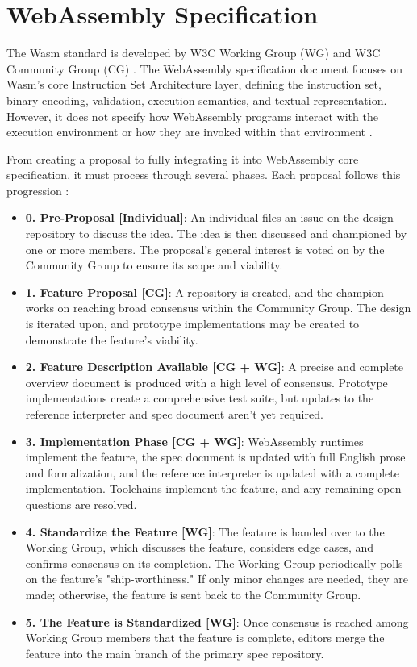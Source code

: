 \section{WebAssembly Specification}
\label{sec:wasm-specification}

The Wasm standard is developed by W3C Working Group (WG) and W3C Community Group (CG) \cite{webassemblycommunitygroup_2023_webassembly}. The WebAssembly specification document \cite{webassemblycommunitygroup_2023_webassembly} focuses on Wasm's core Instruction Set Architecture layer, defining the instruction set, binary encoding, validation, execution semantics, and textual representation. However, it does not specify how WebAssembly programs interact with the execution environment or how they are invoked within that environment \cite{webassemblycommunitygroup_2023_webassembly}.

From creating a proposal to fully integrating it into WebAssembly core specification, it must process through several phases. Each proposal follows this progression \cite{webassemblyw3c_2023_webassembly}:
\begin{itemize}
  \item \textbf{0. Pre-Proposal [Individual]}: An individual files an issue on the design repository to discuss the idea. The idea is then discussed and championed by one or more members. 
  The proposal's general interest is voted on by the Community Group to ensure its scope and viability.
  \item \textbf{1. Feature Proposal [CG]}: A repository is created, and the champion works on reaching broad consensus within the Community Group. The design is iterated upon, and prototype implementations may be created to demonstrate the feature's viability.
  \item \textbf{2. Feature Description Available [CG + WG]}: A precise and complete overview document is produced with a high level of consensus. Prototype implementations create a comprehensive 
  test suite, but updates to the reference interpreter and spec document aren't yet required.
  \item \textbf{3. Implementation Phase [CG + WG]}: WebAssembly runtimes implement the feature, the spec document is updated with full English prose and formalization, and the reference interpreter is updated with a complete implementation. Toolchains implement the feature, and any remaining open questions are resolved.
  \item \textbf{4. Standardize the Feature [WG]}: The feature is handed over to the Working Group, which discusses the feature, considers edge cases, and confirms consensus on its completion. 
  The Working Group periodically polls on the feature's "ship-worthiness." If only minor changes are needed, they are made; otherwise, the feature is sent back to the Community Group.
  \item \textbf{5. The Feature is Standardized [WG]}: Once consensus is reached among Working Group members that the feature is complete, editors merge the feature into the main branch of the primary spec repository.
\end{itemize}

